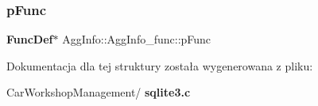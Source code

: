 \mbox{\label{struct_agg_info_1_1_agg_info__func_a840478e8ec53cefa57b50228f6fdafe4}} 
\subsubsection{pFunc}
{\footnotesize\ttfamily \textbf{ Func\+Def}$\ast$ Agg\+Info\+::\+Agg\+Info\+\_\+func\+::p\+Func}



Dokumentacja dla tej struktury została wygenerowana z pliku\+:\begin{DoxyCompactItemize}
\item 
Car\+Workshop\+Management/\textbf{ sqlite3.\+c}\end{DoxyCompactItemize}
